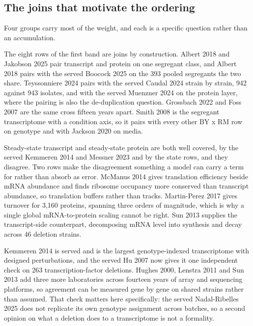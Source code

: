 \subsection{The joins that motivate the ordering}

Four groups carry most of the weight, and each is a specific question rather than an
accumulation.

 The eight rows of the first band are joins by
construction. Albert 2018 and Jakobson 2025 pair transcript and protein on one segregant
class, and Albert 2018 pairs with the served Boocock 2025 on the 393 pooled segregants
the two share. Teyssonniere 2024 pairs with the served Caudal 2024 strain by strain, 942
against 943 isolates, and with the served Muenzner 2024 on the protein layer, where the
pairing is also the de-duplication question. Grossbach 2022 and Foss 2007 are the same
cross fifteen years apart. Smith 2008 is the segregant transcriptome with a condition
axis, so it pairs with every other BY x RM row on genotype and with Jackson 2020 on media.

 Steady-state
transcript and steady-state protein are both well covered, by the served Kemmeren 2014 and
Messner 2023 and by the state rows, and they disagree. Two rows make the disagreement
something a model can carry a term for rather than absorb as error. McManus 2014 gives
translation efficiency beside mRNA abundance and finds ribosome occupancy more conserved
than transcript abundance, so translation buffers rather than tracks. Martin-Perez 2017
gives turnover for 3,160 proteins, spanning three orders of magnitude, which is why a
single global mRNA-to-protein scaling cannot be right. Sun 2013 supplies the transcript-side
counterpart, decomposing mRNA level into synthesis and decay across 46 deletion strains.

 Kemmeren 2014 is
served and is the largest genotype-indexed transcriptome with designed perturbations, and
the served Hu 2007 now gives it one independent check on 263 transcription-factor
deletions. Hughes 2000, Lenstra 2011 and Sun 2013 add three more laboratories across
fourteen years of array and sequencing platforms, so agreement can be measured gene by
gene on shared strains rather than assumed. That check matters here specifically: the
served Nadal-Ribelles 2025 does not replicate its own genotype assignment across batches,
so a second opinion on what a deletion does to a transcriptome is not a formality.

